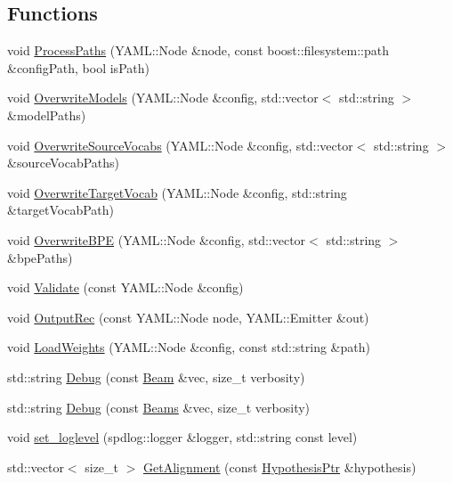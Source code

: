 \subsection*{Functions}
\begin{DoxyCompactItemize}
\item 
void \hyperlink{namespaceamunmt_aa294dffea2547350d8ba90401bbe85d1}{Process\+Paths} (Y\+A\+M\+L\+::\+Node \&node, const boost\+::filesystem\+::path \&config\+Path, bool is\+Path)
\item 
void \hyperlink{namespaceamunmt_a223f2f561452f574093618cd336c43de}{Overwrite\+Models} (Y\+A\+M\+L\+::\+Node \&config, std\+::vector$<$ std\+::string $>$ \&model\+Paths)
\item 
void \hyperlink{namespaceamunmt_a343a63d53ad92c670141e5740f3eab7a}{Overwrite\+Source\+Vocabs} (Y\+A\+M\+L\+::\+Node \&config, std\+::vector$<$ std\+::string $>$ \&source\+Vocab\+Paths)
\item 
void \hyperlink{namespaceamunmt_a1b4b3e3a5cfcb79de4fd92c34e3fa4e3}{Overwrite\+Target\+Vocab} (Y\+A\+M\+L\+::\+Node \&config, std\+::string \&target\+Vocab\+Path)
\item 
void \hyperlink{namespaceamunmt_a3d7f2e636dd3e33b80855722d08f9a18}{Overwrite\+B\+PE} (Y\+A\+M\+L\+::\+Node \&config, std\+::vector$<$ std\+::string $>$ \&bpe\+Paths)
\item 
void \hyperlink{namespaceamunmt_ad51b66163a1437dc0ffd4aedbb0bd067}{Validate} (const Y\+A\+M\+L\+::\+Node \&config)
\item 
void \hyperlink{namespaceamunmt_aef479ee5514fb431474e91580190fd39}{Output\+Rec} (const Y\+A\+M\+L\+::\+Node node, Y\+A\+M\+L\+::\+Emitter \&out)
\item 
void \hyperlink{namespaceamunmt_a18aa660f48877e9279fb9e91dee85ce2}{Load\+Weights} (Y\+A\+M\+L\+::\+Node \&config, const std\+::string \&path)
\item 
std\+::string \hyperlink{namespaceamunmt_a807aed7e91d9c04595d8e32c1157ca4e}{Debug} (const \hyperlink{namespaceamunmt_a534a3a9a1d99c01a5adf05e700a26012}{Beam} \&vec, size\+\_\+t verbosity)
\item 
std\+::string \hyperlink{namespaceamunmt_a6e2a280e85c7e0845ed2c3bb793a86af}{Debug} (const \hyperlink{namespaceamunmt_a90a1b353bc62cb90bc8e8da7edc3edc0}{Beams} \&vec, size\+\_\+t verbosity)
\item 
void \hyperlink{namespaceamunmt_a14c0b46e2e86d44662d37f953788043c}{set\+\_\+loglevel} (spdlog\+::logger \&logger, std\+::string const level)
\item 
std\+::vector$<$ size\+\_\+t $>$ \hyperlink{namespaceamunmt_acf078c1279ce98077a069ba41811faa6}{Get\+Alignment} (const \hyperlink{namespaceamunmt_a9dd9d255e51649b0af19d0e895d52d2f}{Hypothesis\+Ptr} \&hypothesis)

\end{DoxyCompactItemize}
